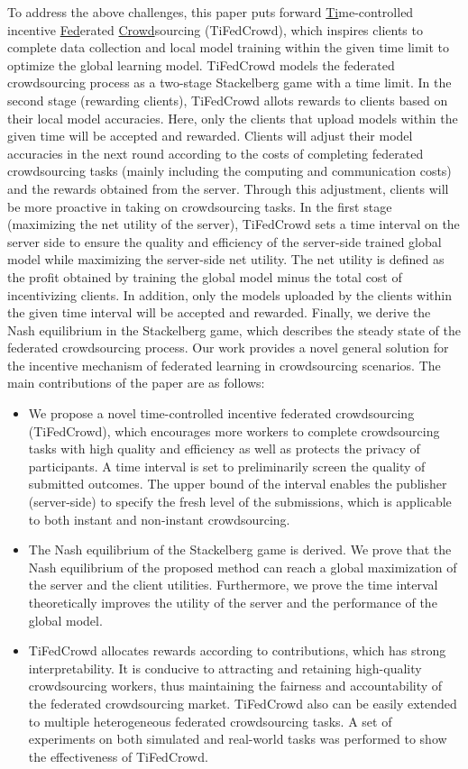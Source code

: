 \documentclass[final,1p,times]{elsarticle}
\begin{document}
To address the above challenges, this paper puts forward \underline{Ti}me-controlled incentive \underline{Fed}erated \underline{Crowd}sourcing (TiFedCrowd), which inspires clients to complete data collection and local model training within the given time limit to optimize the global learning model. TiFedCrowd models the federated crowdsourcing process as a two-stage Stackelberg game \citep{li2017review} with a time limit. In the second stage (rewarding clients), TiFedCrowd allots rewards to clients based on their local model accuracies. Here, only the clients that upload models within the given time will be accepted and rewarded. Clients will adjust their model accuracies in the next round according to the costs of completing federated crowdsourcing tasks (mainly including the computing and communication costs) and the rewards obtained from the server. Through this adjustment, clients will be more proactive in taking on crowdsourcing tasks. In the first stage (maximizing the net utility of the server), TiFedCrowd sets a time interval on the server side to ensure the quality and efficiency of the server-side trained global model while maximizing the server-side net utility. The net utility is defined as the profit obtained by training the global model minus the total cost of incentivizing clients. In addition, only the models uploaded by the clients within the given time interval will be accepted and rewarded. Finally, we derive the Nash equilibrium in the Stackelberg game, which describes the steady state of the federated crowdsourcing process. Our work provides a novel general solution for the incentive mechanism of federated learning in crowdsourcing scenarios. The main contributions of the paper are as follows:

\begin{itemize}
	\item We propose a novel time-controlled incentive federated crowdsourcing (TiFedCrowd), which encourages more workers to complete crowdsourcing tasks with high quality and efficiency as well as protects the privacy of participants. A time interval is set to preliminarily screen the quality of submitted outcomes. The upper bound of the interval enables the publisher (server-side) to specify the fresh level of the submissions, which is applicable to both instant and non-instant crowdsourcing.
	\item The Nash equilibrium of the Stackelberg game is derived. We prove that the Nash equilibrium of the proposed method can reach a  global maximization of the server and the client utilities. Furthermore, we prove the time interval theoretically improves the utility of the server and the performance of the global model.
	\item TiFedCrowd allocates rewards according to contributions, which has strong interpretability. It is conducive to attracting and retaining high-quality crowdsourcing workers, thus maintaining the fairness and accountability of the federated crowdsourcing market. TiFedCrowd also can be easily extended to multiple heterogeneous federated crowdsourcing tasks. A set of experiments on both simulated and real-world tasks was performed to show the effectiveness of TiFedCrowd.
\end{itemize}
\end{document}
